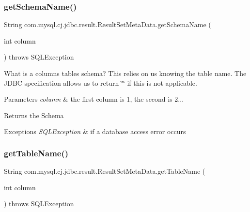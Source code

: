 \subsubsection{\texorpdfstring{get\+Schema\+Name()}{getSchemaName()}}
{\footnotesize\ttfamily String com.\+mysql.\+cj.\+jdbc.\+result.\+Result\+Set\+Meta\+Data.\+get\+Schema\+Name (\begin{DoxyParamCaption}\item[{int}]{column }\end{DoxyParamCaption}) throws S\+Q\+L\+Exception}

What is a column\textquotesingle{}s table\textquotesingle{}s schema? This relies on us knowing the table name. The J\+D\+BC specification allows us to return \char`\"{}\char`\"{} if this is not applicable.


\begin{DoxyParams}{Parameters}
{\em column} & the first column is 1, the second is 2...\\
\hline
\end{DoxyParams}
\begin{DoxyReturn}{Returns}
the Schema
\end{DoxyReturn}

\begin{DoxyExceptions}{Exceptions}
{\em S\+Q\+L\+Exception} & if a database access error occurs \\
\hline
\end{DoxyExceptions}
\mbox{\label{classcom_1_1mysql_1_1cj_1_1jdbc_1_1result_1_1_result_set_meta_data_a8a562f4a15f95b436faccb17586dd031}} 
\subsubsection{\texorpdfstring{get\+Table\+Name()}{getTableName()}}
{\footnotesize\ttfamily String com.\+mysql.\+cj.\+jdbc.\+result.\+Result\+Set\+Meta\+Data.\+get\+Table\+Name (\begin{DoxyParamCaption}\item[{int}]{column }\end{DoxyParamCaption}) throws S\+Q\+L\+Exception}

